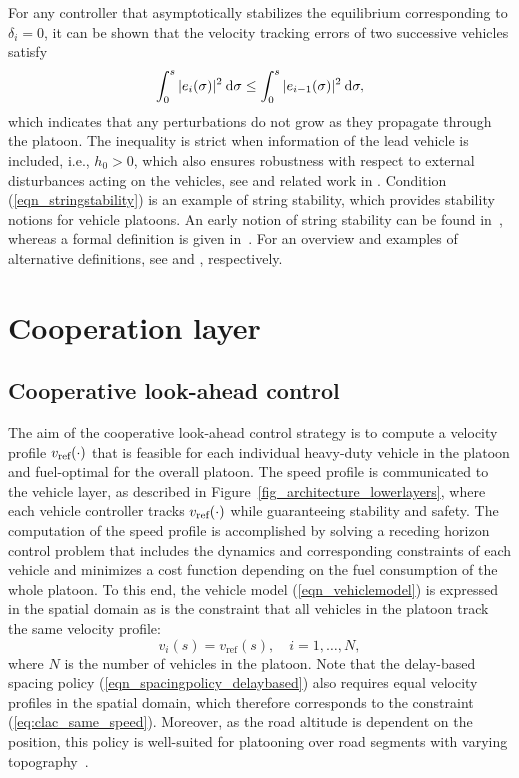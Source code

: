 \documentclass[journal]{IEEEtran}
\newcommand{\vref}{\ensuremath{v_{\text{\rm ref}}}}
\begin{document}
For any controller that asymptotically stabilizes the equilibrium corresponding to $\delta_i = 0$, it can be shown that the velocity tracking errors of two successive vehicles satisfy
\begin{align}
\int_0^s |e_i(\sigma)|^2 \:\mathrm{d}\sigma \leq \int_0^s |e_{i-1}(\sigma)|^2 \:\mathrm{d}\sigma,
\label{eqn_stringstability}
\end{align}
which indicates that any perturbations do not grow as they propagate through the platoon. The inequality is strict when information of the lead vehicle is included, i.e., $h_0>0$, which also ensures robustness with respect to external disturbances acting on the vehicles, see \cite{besselink_2015b} and related work in \cite{seiler_2004}. Condition (\ref{eqn_stringstability}) is an example of string stability, which provides stability notions for vehicle platoons. An early notion of string stability can be found in~\cite{peppard_1974}, whereas a formal definition is given in~\cite{swaroop_1996}. For an overview and examples of alternative definitions, see \cite{ploeg_2014} and \cite{fenton_1968,sheikholeslam_1993}, respectively.




\section{Cooperation layer}\label{sec_cooperationlayer}


\subsection{Cooperative look-ahead control}\label{sec_clac}
The aim of the cooperative look-ahead control strategy is to compute a velocity profile $\vref(\cdot)$ that is feasible for each individual heavy-duty vehicle in the platoon and fuel-optimal for the overall platoon. The speed profile is communicated to the vehicle layer, as described in Figure~\ref{fig_architecture_lowerlayers}, where each vehicle controller tracks $\vref(\cdot)$ while guaranteeing stability and safety. The computation of the speed profile is accomplished by solving a receding horizon control problem that includes the dynamics and corresponding constraints of each vehicle and minimizes a cost function depending on the fuel consumption of the whole platoon. To this end, the vehicle model (\ref{eqn_vehiclemodel}) is expressed in the spatial domain as is the constraint that all vehicles in the platoon track the same velocity profile:
\begin{equation}
v_i(s)=v_\text{ref}(s), \quad i=1,\ldots,N,
\label{eq:clac_same_speed}
\end{equation}
where $N$ is the number of vehicles in the platoon. Note that the delay-based spacing policy (\ref{eqn_spacingpolicy_delaybased}) also requires equal velocity profiles in the spatial domain, which therefore corresponds to the constraint (\ref{eq:clac_same_speed}). Moreover, as the road altitude is dependent on the position, this policy is well-suited for platooning over road segments with varying topography~\cite{turri_2015}.
\end{document}
